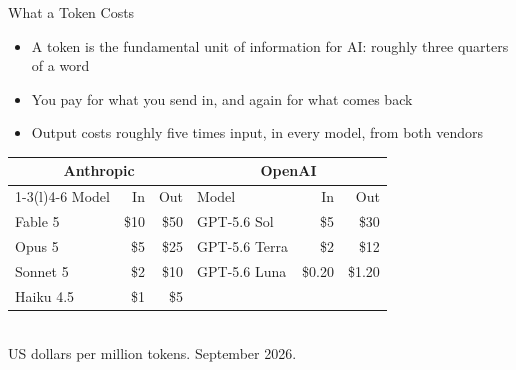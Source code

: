 \documentclass[aspectratio=169]{beamer}
\begin{document}
\begin{frame}{What a Token Costs}
    \begin{itemize}\setlength{\itemsep}{5pt}
        \item A token is the fundamental unit of information for AI: roughly three quarters
              of a word
        \item You pay for what you send in, and again for what comes back
        \item Output costs roughly five times input, in every model, from both vendors
    \end{itemize}

    \vspace{0.6em}
    \begin{center}
    \small
    \begin{tabular}{lrr@{\hskip 2.2em}lrr}
        \toprule
        \multicolumn{3}{c}{Anthropic} & \multicolumn{3}{c}{OpenAI} \\
        \cmidrule(r){1-3}\cmidrule(l){4-6}
        Model & In & Out & Model & In & Out \\
        \midrule
        Fable 5     & \$10 & \$50 & GPT-5.6 Sol   & \$5    & \$30   \\
        Opus 5      & \$5  & \$25 & GPT-5.6 Terra & \$2    & \$12   \\
        Sonnet 5    & \$2  & \$10 & GPT-5.6 Luna  & \$0.20 & \$1.20 \\
        Haiku 4.5   & \$1  & \$5  &               &        &        \\
        \bottomrule
    \end{tabular}
    \\[0.3em]
    {\scriptsize US dollars per million tokens. September 2026.}
    \end{center}
\end{frame}
\end{document}
